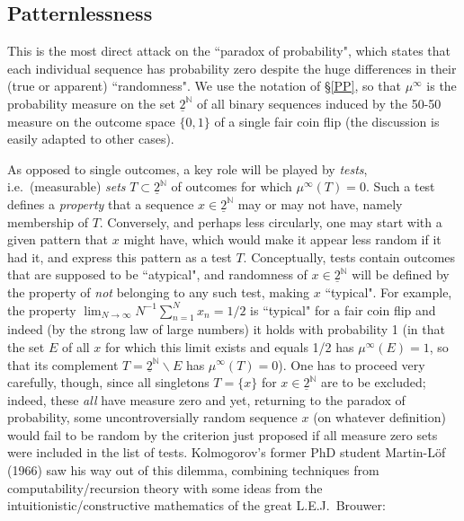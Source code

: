 \documentclass[11pt,a4paper]{article}
\numberwithin{equation}{section}
\newcommand{\ul}{\underline}
\newcommand{\raw}{\rightarrow}
\newcommand{\inv}{^{-1}}
\newcommand{\N}{{\mathbb N}} \newcommand{\R}{{\mathbb R}}
\begin{document}
\subsection*{Patternlessness}
This is the most direct attack on the ``paradox of probability", which states that each individual sequence has probability zero despite the huge differences in their (true or apparent) ``randomness".  We use the notation of \S\ref{PP}, so that $\mu^{\infty}$ is the probability measure on the set $\ul{2}^{\N}$ of all binary sequences induced by the 50-50 measure on the outcome space $\{0,1\}$ of a single fair coin flip (the discussion is easily adapted to other cases).

As opposed to single outcomes, a key role will be played by \emph{tests}, i.e.\ (measurable) \emph{sets} $T\subset \ul{2}^{\N}$ of outcomes for which $\mu^{\infty}(T)=0$. Such a test defines a \emph{property} that a sequence $x\in \ul{2}^{\N}$ may or may not have, namely membership of $T$. Conversely, and perhaps less circularly, one may start with a given pattern that $x$ might have, which would make it appear less random if it had it, and express this pattern as a test $T$. Conceptually, tests contain outcomes that are supposed to be ``atypical", and randomness of $x\in \ul{2}^{\N}$ will be defined by the property of \emph{not} belonging to any such test, making $x$ ``typical".  For example, the property
$\lim_{N\raw\infty}  N\inv  \sum_{n=1}^N x_n=1/2$ is ``typical" for a fair coin flip and indeed (by the strong law of large numbers) it holds with probability 1 (in that the set $E$ of all $x$ for which this limit exists and equals 1/2 has $\mu^{\infty}(E)=1$, so that its complement $T=\ul{2}^{\N}\backslash E$ has $\mu^{\infty}(T)=0$).
One has to proceed very carefully, though, since all singletons  $T=\{x\}$ for  $x\in  \ul{2}^{\N}$ are to be excluded; indeed, these \emph{all} have measure zero and yet, returning to the paradox of probability, some uncontroversially  random sequence $x$ (on whatever definition) would fail to be random by the criterion just proposed if all measure zero sets were included in the list of tests. Kolmogorov's former PhD student Martin-L\"{o}f (1966) saw his way out of
 this dilemma, combining techniques from computability/recursion theory with some ideas from the intuitionistic/constructive mathematics of the great L.E.J.\ Brouwer:
\end{document}

